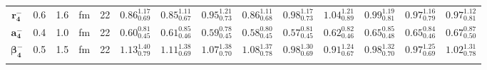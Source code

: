 \begin{tabular}{ c c c c c c c c c c c c c c}
$\mathbf{r_{4}^{-}}$ & 0.6 & 1.6 & fm & 22 & $0.86^{1.17}_{0.69}$ & $0.85^{1.11}_{0.67}$ & $0.95^{1.21}_{0.73}$ & $0.86^{1.11}_{0.68}$ & $0.98^{1.17}_{0.73}$ & $1.04^{1.21}_{0.89}$ & $0.99^{1.19}_{0.81}$ & $0.97^{1.16}_{0.79}$ & $0.97^{1.12}_{0.81}$\\ 
$\mathbf{a_{4}^{-}}$ & 0.4 & 1.0 & fm & 22 & $0.60^{0.81}_{0.45}$ & $0.61^{0.85}_{0.46}$ & $0.59^{0.78}_{0.45}$ & $0.58^{0.80}_{0.45}$ & $0.57^{0.81}_{0.45}$ & $0.62^{0.82}_{0.46}$ & $0.65^{0.85}_{0.48}$ & $0.65^{0.84}_{0.46}$ & $0.67^{0.87}_{0.50}$\\ 
$\mathbf{\beta_{4}^{-}}$ & 0.5 & 1.5 & fm & 22 & $1.13^{1.40}_{0.79}$ & $1.11^{1.38}_{0.69}$ & $1.07^{1.38}_{0.70}$ & $1.08^{1.37}_{0.78}$ & $0.98^{1.30}_{0.69}$ & $0.91^{1.24}_{0.67}$ & $0.98^{1.32}_{0.70}$ & $0.97^{1.25}_{0.69}$ & $1.02^{1.31}_{0.78}$\\ 
\\ 
\end{tabular}
\egroup